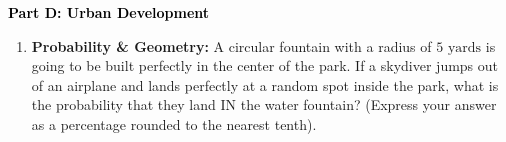\documentclass[12pt, letterpaper, fleqn]{article}
\begin{document}
\newpage

\begin{tcolorbox}[colback=customteal!20]
\large\textcolor{black}{\textbf{Part D: Urban Development}}
\end{tcolorbox}

\vspace{3mm}

\begin{enumerate}[itemsep=2.5cm, leftmargin=0.6cm, resume]
\item \textbf{Probability \& Geometry:} A circular fountain with a radius of $5\text{ yards}$ is going to be built perfectly in the center of the park. If a skydiver jumps out of an airplane and lands perfectly at a random spot inside the park, what is the probability that they land IN the water fountain? (Express your answer as a percentage rounded to the nearest tenth).
\end{enumerate}
\end{document}
